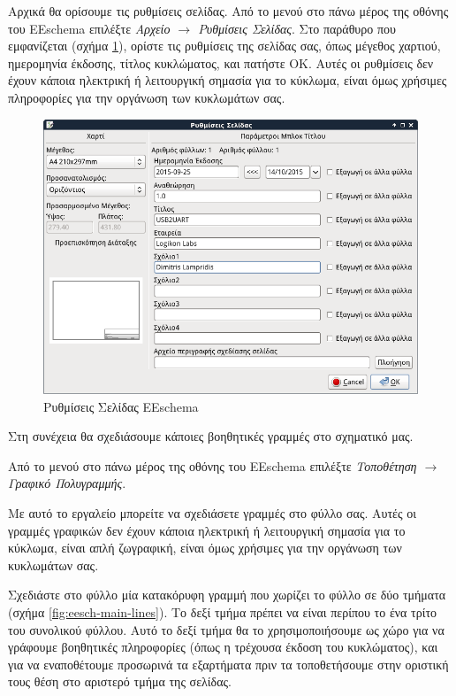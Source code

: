 \documentclass[a4paper]{article}
\begin{document}
Αρχικά θα ορίσουμε τις ρυθμίσεις σελίδας. Από το μενού στο πάνω μέρος της οθόνης του \textenglish{EEschema} επιλέξτε \textit{Αρχείο $\rightarrow$ Ρυθμίσεις Σελίδας}. Στο παράθυρο που εμφανίζεται (σχήμα \ref{fig:eesch-dial-pagesett}), ορίστε τις ρυθμίσεις της σελίδας σας, όπως μέγεθος χαρτιού, ημερομηνία έκδοσης, τίτλος κυκλώματος, και πατήστε ΟΚ. Αυτές οι ρυθμίσεις δεν έχουν κάποια ηλεκτρική ή λειτουργική σημασία για το κύκλωμα, είναι όμως χρήσιμες πληροφορίες για την οργάνωση των κυκλωμάτων σας.

\begin{figure}
  \begin{center}
    \includegraphics[width=.5\textwidth]{img/eesch-dial-pagesett.png}
    \caption{Ρυθμίσεις Σελίδας \textenglish{EEschema}}
    \label{fig:eesch-dial-pagesett}
  \end{center}
\end{figure}

Στη συνέχεια θα σχεδιάσουμε κάποιες βοηθητικές γραμμές στο σχηματικό μας.

Από το μενού στο πάνω μέρος της οθόνης του \textenglish{EEschema} επιλέξτε \textit{Τοποθέτηση $\rightarrow$ Γραφικό Πολυγραμμής}.

Με αυτό το εργαλείο μπορείτε να σχεδιάσετε γραμμές στο φύλλο σας. Αυτές οι γραμμές γραφικών δεν έχουν κάποια ηλεκτρική ή λειτουργική σημασία για το κύκλωμα, είναι απλή ζωγραφική, είναι όμως χρήσιμες για την οργάνωση των κυκλωμάτων σας.

Σχεδιάστε στο φύλλο μία κατακόρυφη γραμμή που χωρίζει το φύλλο σε δύο τμήματα (σχήμα \ref{fig:eesch-main-lines}). Το δεξί τμήμα πρέπει να είναι περίπου το ένα τρίτο του συνολικού φύλλου. Αυτό το δεξί τμήμα θα το χρησιμοποιήσουμε ως χώρο για να γράφουμε  βοηθητικές πληροφορίες (όπως η τρέχουσα έκδοση του κυκλώματος), και για να εναποθέτουμε προσωρινά τα εξαρτήματα πριν τα τοποθετήσουμε στην οριστική τους θέση στο αριστερό τμήμα της σελίδας.
\end{document}
